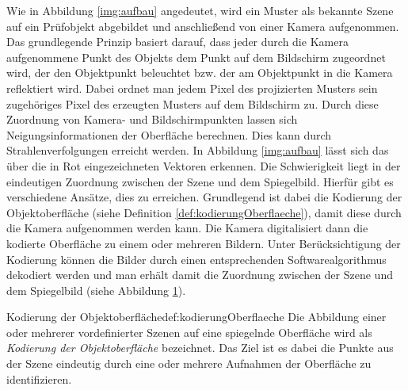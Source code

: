\noindent
Wie in Abbildung \ref{img:aufbau} angedeutet, wird ein Muster als bekannte Szene auf ein Prüfobjekt abgebildet und anschließend von einer Kamera aufgenommen.
Das grundlegende Prinzip basiert darauf, dass jeder durch die Kamera aufgenommene Punkt des Objekts dem Punkt auf dem Bildschirm zugeordnet wird, der den Objektpunkt beleuchtet bzw. der am Objektpunkt in die Kamera reflektiert wird.
Dabei ordnet man jedem Pixel des projizierten Musters sein zugehöriges Pixel des erzeugten Musters auf dem Bildschirm zu.
Durch diese Zuordnung von Kamera- und Bildschirmpunkten lassen sich Neigungsinformationen der Oberfläche berechnen.
Dies kann durch Strahlenverfolgungen erreicht werden.
In Abbildung \ref{img:aufbau} lässt sich das über die in Rot eingezeichneten Vektoren erkennen.
Die Schwierigkeit liegt in der eindeutigen Zuordnung zwischen der Szene und dem Spiegelbild.
Hierfür gibt es verschiedene Ansätze, dies zu erreichen.
Grundlegend ist dabei die Kodierung der Objektoberfläche (siehe Definition \ref{def:kodierungOberflaeche}), damit diese durch die Kamera aufgenommen werden kann.
Die Kamera digitalisiert dann die kodierte Oberfläche zu einem oder mehreren Bildern.
Unter Berücksichtigung der Kodierung können die Bilder durch einen entsprechenden Softwarealgorithmus dekodiert werden und man erhält damit die Zuordnung zwischen der Szene und dem Spiegelbild (siehe Abbildung \ref{tikz:abbKodierungUndDekodierung}).
%
\begin{Definition}{Kodierung der Objektoberfläche}{def:kodierungOberflaeche}
	Die Abbildung einer oder mehrerer vordefinierter Szenen auf eine spiegelnde Oberfläche wird als \textit{Kodierung der Objektoberfläche} bezeichnet.
	Das Ziel ist es dabei die Punkte aus der Szene eindeutig durch eine oder mehrere Aufnahmen der Oberfläche zu identifizieren.
\end{Definition}
%
%
{
	\begin{figure}[H]
		\centering
		
		\label{tikz:abbKodierungUndDekodierung}
	\end{figure}
}

